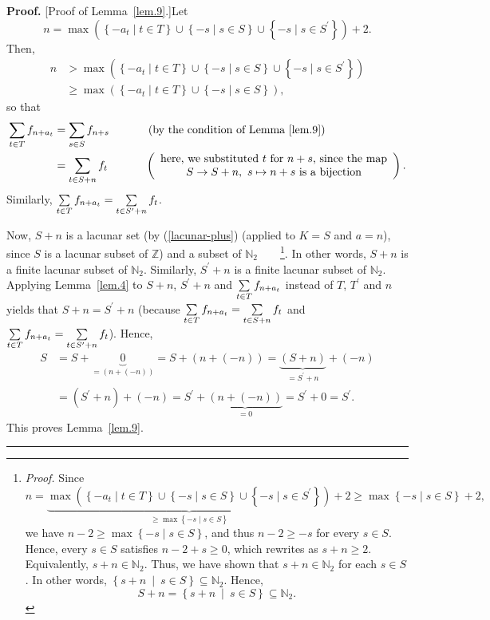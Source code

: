\documentclass[numbers=enddot,12pt,final,onecolumn,notitlepage]{scrartcl}%
\numberwithin{exer}{section}
\theoremstyle{definition}
\newenvironment{proof}[1][Proof]{\noindent\textbf{#1.} }{\ \rule{0.5em}{0.5em}}
\let\sumnonlimits\sum
\renewcommand{\sum}{\sumnonlimits\limits}
\begin{document}
\begin{proof}
[Proof of Lemma~\ref{lem.9}.]Let%
\[
n=\max\left(  \left\{  -a_{t}\mid t\in T\right\}  \cup\left\{  -s\mid s\in
S\right\}  \cup\left\{  -s\mid s\in S^{\prime}\right\}  \right)  +2.
\]
Then,%
\begin{align*}
n  &  >\max\left(  \left\{  -a_{t}\mid t\in T\right\}  \cup\left\{  -s\mid
s\in S\right\}  \cup\left\{  -s\mid s\in S^{\prime}\right\}  \right) \\
&  \geq\max\left(  \left\{  -a_{t}\mid t\in T\right\}  \cup\left\{  -s\mid
s\in S\right\}  \right)  ,
\end{align*}
so that%
\begin{align*}
\sum\limits_{t\in T}f_{n+a_{t}}  &  =\sum\limits_{s\in S}f_{n+s}%
\ \ \ \ \ \ \ \ \ \ \left(  \text{by the condition of Lemma~\ref{lem.9}%
}\right) \\
&  =\sum\limits_{t\in S+n}f_{t}\ \ \ \ \ \ \ \ \ \ \left(
\begin{array}
[c]{c}%
\text{here, we substituted }t\text{ for }n+s\text{, since the map}\\
S\rightarrow S+n,\ s\mapsto n+s\text{ is a bijection}%
\end{array}
\right)  .
\end{align*}
Similarly, $\sum\limits_{t\in T}f_{n+a_{t}}=\sum\limits_{t\in S^{\prime}%
+n}f_{t}$.

Now, $S+n$ is a lacunar set (by (\ref{lacunar-plus}) (applied to $K=S$ and
$a=n$), since $S$ is a lacunar subset of $\mathbb{Z}$) and a subset of
$\mathbb{N}_{2}$\ \ \ \ \footnote{\textit{Proof.} Since%
\[
n=\underbrace{\max\left(  \left\{  -a_{t}\mid t\in T\right\}  \cup\left\{
-s\mid s\in S\right\}  \cup\left\{  -s\mid s\in S^{\prime}\right\}  \right)
}_{\geq\max\left\{  -s\mid s\in S\right\}  }+2\geq\max\left\{  -s\mid s\in
S\right\}  +2,
\]
we have $n-2\geq\max\left\{  -s\mid s\in S\right\}  $, and thus $n-2\geq-s$
for every $s\in S$. Hence, every $s\in S$ satisfies $n-2+s\geq0$, which
rewrites as $s+n\geq2$. Equivalently, $s+n\in\mathbb{N}_{2}$. Thus, we have
shown that $s+n\in\mathbb{N}_{2}$ for each $s\in S$. In other words, $\left\{
s+n\ \mid\ s\in S\right\}  \subseteq\mathbb{N}_{2}$. Hence,
\[
S+n=\left\{  s+n\ \mid\ s\in S\right\}  \subseteq\mathbb{N}_{2}.
\]
}. In other words, $S+n$ is a finite lacunar subset of $\mathbb{N}_{2}$.
Similarly, $S^{\prime}+n$ is a finite lacunar subset of $\mathbb{N}_{2}$.
Applying Lemma~\ref{lem.4} to $S+n$, $S^{\prime}+n$ and $\sum\limits_{t\in
T}f_{n+a_{t}}$ instead of $T$, $T^{\prime}$ and $n$ yields that $S+n=S^{\prime
}+n$ (because $\sum\limits_{t\in T}f_{n+a_{t}}=\sum\limits_{t\in S+n}f_{t}$
and $\sum\limits_{t\in T}f_{n+a_{t}}=\sum\limits_{t\in S^{\prime}+n}f_{t}$).
Hence,%
\begin{align*}
S  &  =S+\underbrace{0}_{=\left(  n+\left(  -n\right)  \right)  }=S+\left(
n+\left(  -n\right)  \right)  =\underbrace{\left(  S+n\right)  }_{=S^{\prime
}+n}+\left(  -n\right) \\
&  =\left(  S^{\prime}+n\right)  +\left(  -n\right)  =S^{\prime}%
+\underbrace{\left(  n+\left(  -n\right)  \right)  }_{=0}=S^{\prime
}+0=S^{\prime}.
\end{align*}
This proves Lemma~\ref{lem.9}.
\end{proof}
\end{document}
